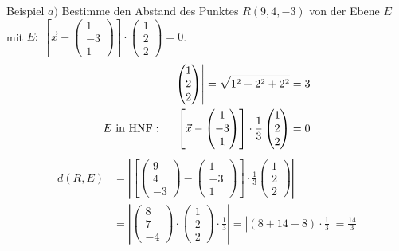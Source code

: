 \documentclass{article}
\begin{document}
\begin{boxx}[DarkBlue]{Beispiel}
    $a)$\hspace{3mm} Bestimme den Abstand des Punktes $R(9,4,-3)$ von der Ebene $E$ mit $\displaystyle E:\; \left[\vec{x} - \begin{pmatrix}1\\-3\\1\end{pmatrix}\right] \cdot \begin{pmatrix}1\\2\\2\end{pmatrix} = 0$. 
    \begin{align*}
        \left|\begin{pmatrix}1\\2\\2\end{pmatrix}\right| = \sqrt{1^2 + 2^2 + 2^2} &= 3 \\
        E \text{ in HNF}: \hspace*{5mm} \left[\vec{x} - \begin{pmatrix}1\\-3\\1\end{pmatrix}\right] \cdot \frac{1}{3}\begin{pmatrix}1\\2\\2\end{pmatrix} &= 0
    \end{align*}
    \begin{align*}
        d(R,E) &= \left|\left[\begin{pmatrix}9\\4\\-3\end{pmatrix}-\begin{pmatrix}1\\-3\\1\end{pmatrix}\right] \cdot \frac{1}{3} \begin{pmatrix}1\\2\\2\end{pmatrix}\right| \\
        &= \left|\begin{pmatrix}8\\7\\-4\end{pmatrix} \cdot \begin{pmatrix}1\\2\\2\end{pmatrix}\cdot \frac{1}{3}\right| = \left|(8+14-8) \cdot \frac{1}{3}\right| = \frac{14}{3}
    \end{align*}
\end{boxx}
\end{document}
